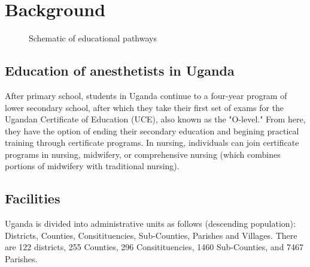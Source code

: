 \documentclass[12pt]{article} %
\begin{document}

\section{Background} %



\begin{figure}[H] %
\caption{Schematic of educational pathways}
\label{fig:edupathways}
\end{figure}


\subsection{Education of anesthetists in Uganda} %

After primary school, students in Uganda continue to a four-year program of lower secondary school, after which they take their first set of exams for the Ugandan Certificate of Education (UCE), also known as the "O-level." From here, they have the option of ending their secondary education and begining practical training through certificate programs.  
\cite{UNFPA2009}
In nursing, individuals can join certificate programs in nursing, midwifery, or comprehensive nursing (which combines portions of midwifery with traditional nursing).









\subsection{Facilities} %

Uganda is divided into administrative units as follows (descending population): Districts, Counties, Consitituencies, Sub-Counties, Parishes and Villages. 
There are 122 districts, 255 Counties, 296 Consitituencies, 1460 Sub-Counties, and 7467 Parishes. 
\end{document}
